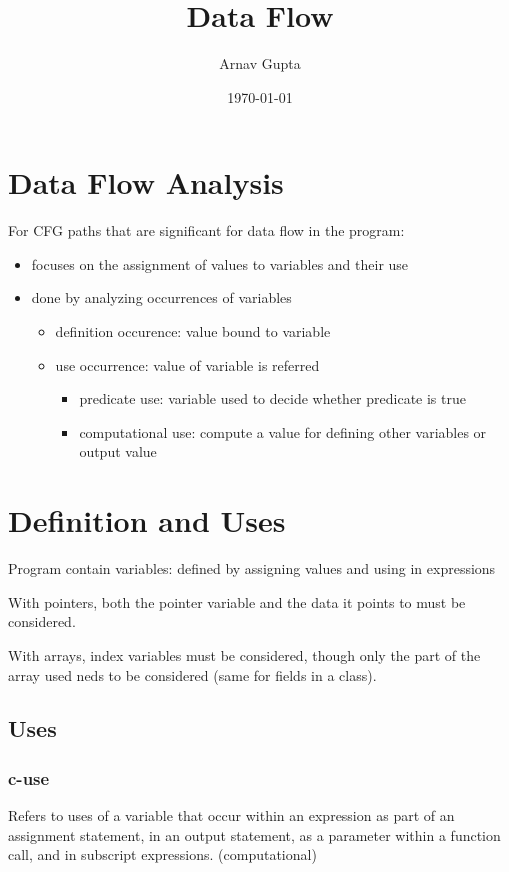 \documentclass[11pt]{article}
\author{Arnav Gupta}
\date{\today}
\title{Data Flow}
\begin{document}
\maketitle
\tableofcontents

\section{Data Flow Analysis}
\label{sec:orgfcfa461}
For CFG paths that are significant for data flow in the program:
\begin{itemize}
\item focuses on the assignment of values to variables and their use
\item done by analyzing occurrences of variables
\begin{itemize}
\item definition occurence: value bound to variable
\item use occurrence: value of variable is referred
\begin{itemize}
\item predicate use: variable used to decide whether predicate is true
\item computational use: compute a value for defining other variables or output value
\end{itemize}
\end{itemize}
\end{itemize}
\section{Definition and Uses}
\label{sec:org84873ff}
Program contain variables: defined by assigning values and using in expressions

With pointers, both the pointer variable and the data it points to
must be considered.

With arrays, index variables must be considered, though only the part of the array
used neds to be considered (same for fields in a class).
\subsection{Uses}
\label{sec:org183a7f9}
\subsubsection{c-use}
\label{sec:orgc91a5ed}
Refers to uses of a variable that occur within an expression as part
of an assignment statement, in an output statement, as a parameter
within a function call, and in subscript expressions. (computational)
\end{document}
